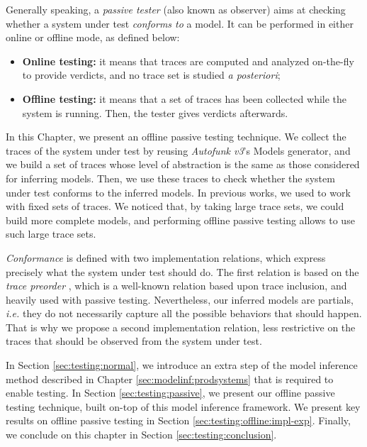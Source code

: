 Generally speaking, a \textit{passive tester} (also known as
observer) aims at checking whether a system under test
\emph{conforms to} a model. It can be performed in either online
or offline mode, as defined below:

\begin{itemize}
    \item \textbf{Online testing:} it means that traces are
        computed and analyzed on-the-fly to provide verdicts, and
        no trace set is studied \emph{a posteriori};

    \item \textbf{Offline testing:} it means that a set of traces
        has been collected while the system is running. Then, the
        tester gives verdicts afterwards.
\end{itemize}

In this Chapter, we present an offline passive testing technique.
We collect the traces of the system under test by reusing
\textit{Autofunk v3}'s Models generator, and we build a set of
traces whose level of abstraction is the same as those considered
for inferring models. Then, we use these traces to check whether
the system under test conforms to the inferred models.  In
previous works, we used to work with fixed sets of traces. We
noticed that, by taking large trace sets, we could build more
complete models, and performing offline passive testing allows to
use such large trace sets.

\emph{Conformance} is defined with two implementation relations,
which express precisely what the system under test should do. The
first relation is based on the \emph{trace preorder}
\cite{DNH84}, which is a well-known relation based upon trace
inclusion, and heavily used with passive testing.  Nevertheless,
our inferred models are partials, \emph{i.e.} they do not
necessarily capture all the possible behaviors that should
happen. That is why we propose a second implementation relation,
less restrictive on the traces that should be observed from the
system under test.

In Section \ref{sec:testing:normal}, we introduce an extra step
of the model inference method described in Chapter
\ref{sec:modelinf:prodsystems} that is required to enable
testing. In Section \ref{sec:testing:passive}, we present our
offline passive testing technique, built on-top of this model
inference framework. We present key results on offline passive
testing in Section \ref{sec:testing:offline:impl-exp}. Finally,
we conclude on this chapter in Section
\ref{sec:testing:conclusion}.

